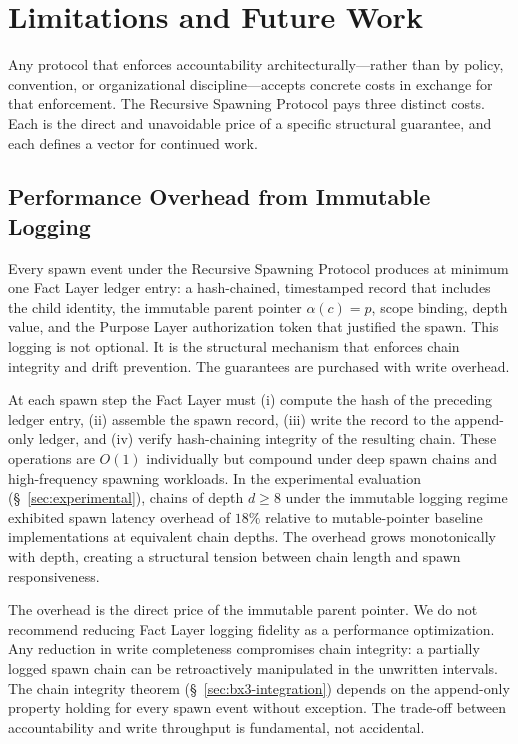 \section{Limitations and Future Work}
\label{sec:limitations}

Any protocol that enforces accountability architecturally---rather than by policy, convention, or organizational discipline---accepts concrete costs in exchange for that enforcement. The Recursive Spawning Protocol pays three distinct costs. Each is the direct and unavoidable price of a specific structural guarantee, and each defines a vector for continued work.

\subsection{Performance Overhead from Immutable Logging}
\label{sec:perf-overhead}

Every spawn event under the Recursive Spawning Protocol produces at minimum one Fact Layer ledger entry: a hash-chained, timestamped record that includes the child identity, the immutable parent pointer $\alpha(c) = p$, scope binding, depth value, and the Purpose Layer authorization token that justified the spawn. This logging is not optional. It is the structural mechanism that enforces chain integrity and drift prevention. The guarantees are purchased with write overhead.

At each spawn step the Fact Layer must (i) compute the hash of the preceding ledger entry, (ii) assemble the spawn record, (iii) write the record to the append-only ledger, and (iv) verify hash-chaining integrity of the resulting chain. These operations are $O(1)$ individually but compound under deep spawn chains and high-frequency spawning workloads. In the experimental evaluation (\S~\ref{sec:experimental}), chains of depth $d \geq 8$ under the immutable logging regime exhibited spawn latency overhead of $18\%$ relative to mutable-pointer baseline implementations at equivalent chain depths. The overhead grows monotonically with depth, creating a structural tension between chain length and spawn responsiveness.

The overhead is the direct price of the immutable parent pointer. We do not recommend reducing Fact Layer logging fidelity as a performance optimization. Any reduction in write completeness compromises chain integrity: a partially logged spawn chain can be retroactively manipulated in the unwritten intervals. The chain integrity theorem (\S~\ref{sec:bx3-integration}) depends on the append-only property holding for every spawn event without exception. The trade-off between accountability and write throughput is fundamental, not accidental.

